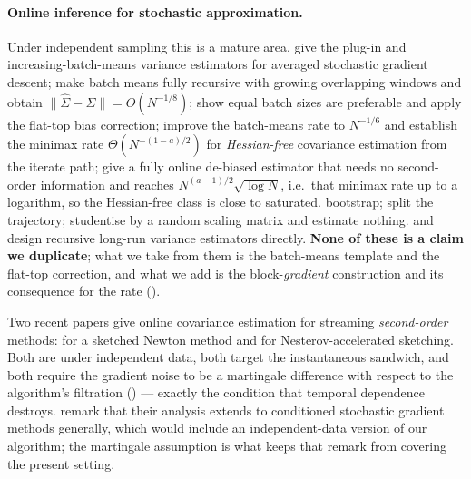 \paragraph{Online inference for stochastic approximation.}
Under independent sampling this is a mature area.
\citet{chen2020statistical} give the plug-in and increasing-batch-means variance
estimators for averaged stochastic gradient descent; \citet{zhu2023online} make batch
means fully recursive with growing overlapping windows and obtain
$\|\widehat\Sigma-\Sigma\|=O(N^{-1/8})$; \citet{singh2025utility} show equal batch sizes
are preferable and apply the flat-top bias correction; \citet{ni2026online} improve the
batch-means rate to $N^{-1/6}$ and establish the minimax rate
$\Theta(N^{-(1-a)/2})$ for \emph{Hessian-free} covariance estimation from the iterate path;
\citet{wei2026refining} give a fully online de-biased estimator that needs no second-order
information and reaches $N^{(a-1)/2}\sqrt{\log N}$, i.e.\ that minimax rate up to a logarithm,
so the Hessian-free class is close to saturated. \citet{fang2018online,fang2019scalable} bootstrap;
\citet{su2023higrad} split the trajectory; \citet{lee2022fast,li2026stream,chen2024online}
studentise by a random scaling matrix and estimate nothing.
\citet{leung2026principles} and \citet{wu2009recursive} design recursive long-run
variance estimators directly. \textbf{None of these is a claim we duplicate};
what we take from them is the batch-means template and the flat-top correction, and what
we add is the block-\emph{gradient} construction and its consequence for the rate
().

Two recent papers give online covariance estimation for streaming \emph{second-order}
methods: \citet{kuang2026online} for a sketched Newton method and
\citet{wang2026inference} for Nesterov-accelerated sketching. Both are under independent
data, both target the instantaneous sandwich, and both require the gradient noise to be a
martingale difference with respect to the algorithm's filtration
(\citealp[Assumption 3.2]{kuang2026online}) --- exactly the condition that temporal
dependence destroys. \citet{kuang2026online} remark that their analysis extends to
conditioned stochastic gradient methods generally, which would include an
independent-data version of our algorithm; the martingale assumption is what keeps that
remark from covering the present setting.

